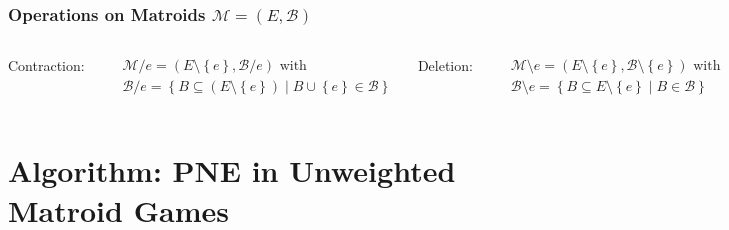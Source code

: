 \documentclass{beamer}
\newcommand{\tupel}[1]{\left(#1\right)}
\newcommand{\set}[1]{\left\{#1\right\}}
\begin{document}
\begin{frame}
  \frametitle{Operations on Matroids $\mathcal{M} = \tupel{E, \mathcal{B}}$}
  \begin{columns}
    \begin{center}
      Contraction:
    \end{center}
    \vspace{-0.6cm}
    \begin{align*}
      &\mathcal{M}/e = \tupel{E\setminus\set{e}, \mathcal{B}/e}\text{ with}\\
      &\mathcal{B}/e = \set{B\subseteq (E\setminus\set{e})\middle| B\cup\set{e}\in\mathcal{B}}
    \end{align*}
    \column<4->{0.5\textwidth}
    \begin{center}
      Deletion:
    \end{center}
    \vspace{-0.6cm}
    \begin{align*}
      &\mathcal{M}\setminus e = \tupel{E\setminus\set{e},\mathcal{B}\setminus \set{e}}\text{ with}\\
      &\mathcal{B}\setminus e = \set{B\subseteq E\setminus\set{e}\middle|B\in\mathcal{B}}
    \end{align*}
  \end{columns}
  \begin{center}
  \end{center}
\end{frame}

\section{Algorithm: PNE in Unweighted Matroid Games}
\end{document}
